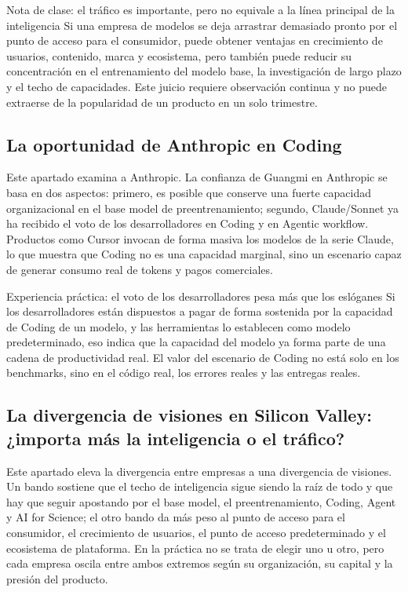 \begin{warningbox}{Nota de clase: el tráfico es importante, pero no equivale a la línea principal de la inteligencia}
Si una empresa de modelos se deja arrastrar demasiado pronto por el punto de acceso para el consumidor, puede obtener ventajas en crecimiento de usuarios, contenido, marca y ecosistema, pero también puede reducir su concentración en el entrenamiento del modelo base, la investigación de largo plazo y el techo de capacidades. Este juicio requiere observación continua y no puede extraerse de la popularidad de un producto en un solo trimestre.
\end{warningbox}

\subsection{La oportunidad de Anthropic en Coding}

Este apartado examina a Anthropic. La confianza de Guangmi en Anthropic se basa en dos aspectos: primero, es posible que conserve una fuerte capacidad organizacional en el base model de preentrenamiento; segundo, Claude/Sonnet ya ha recibido el voto de los desarrolladores en Coding y en Agentic workflow. Productos como Cursor invocan de forma masiva los modelos de la serie Claude, lo que muestra que Coding no es una capacidad marginal, sino un escenario capaz de generar consumo real de tokens y pagos comerciales.

\begin{importantbox}{Experiencia práctica: el voto de los desarrolladores pesa más que los eslóganes}
Si los desarrolladores están dispuestos a pagar de forma sostenida por la capacidad de Coding de un modelo, y las herramientas lo establecen como modelo predeterminado, eso indica que la capacidad del modelo ya forma parte de una cadena de productividad real. El valor del escenario de Coding no está solo en los benchmarks, sino en el código real, los errores reales y las entregas reales.
\end{importantbox}

\subsection{La divergencia de visiones en Silicon Valley: ¿importa más la inteligencia o el tráfico?}

Este apartado eleva la divergencia entre empresas a una divergencia de visiones. Un bando sostiene que el techo de inteligencia sigue siendo la raíz de todo y que hay que seguir apostando por el base model, el preentrenamiento, Coding, Agent y AI for Science; el otro bando da más peso al punto de acceso para el consumidor, el crecimiento de usuarios, el punto de acceso predeterminado y el ecosistema de plataforma. En la práctica no se trata de elegir uno u otro, pero cada empresa oscila entre ambos extremos según su organización, su capital y la presión del producto.


